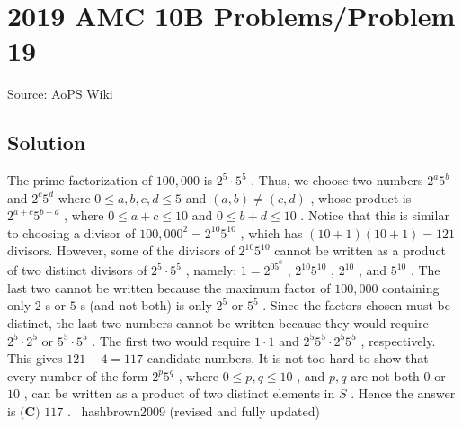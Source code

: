\documentclass[12pt]{article}
\begin{document}
\section*{{2019 AMC 10B Problems/Problem 19}}
Source: AoPS Wiki

\subsection*{Solution}
The prime factorization of $100,000$ is $2^5 \cdot 5^5$ . Thus, we choose two numbers $2^a5^b$ and $2^c5^d$ where $0 \le a,b,c,d \le 5$ and $(a,b) \neq (c,d)$ , whose product is $2^{a+c}5^{b+d}$ , where $0 \le a+c \le 10$ and $0 \le b+d \le 10$ . Notice that this is similar to choosing a divisor of $100,000^2 = 2^{10}5^{10}$ , which has $(10+1)(10+1) = 121$ divisors. However, some of the divisors of $2^{10}5^{10}$ cannot be written as a product of two distinct divisors of $2^5 \cdot 5^5$ , namely: $1 = 2^05^0$ , $2^{10}5^{10}$ , $2^{10}$ , and $5^{10}$ . The last two cannot be written because the maximum factor of $100,000$ containing only $2$ s or $5$ s (and not both) is only $2^5$ or $5^5$ . Since the factors chosen must be distinct, the last two numbers cannot be written because they would require $2^5 \cdot 2^5$ or $5^5 \cdot 5^5$ . The first two would require $1 \cdot 1$ and $2^{5}5^{5} \cdot 2^{5}5^{5}$ , respectively. This gives $121-4 = 117$ candidate numbers. It is not too hard to show that every number of the form $2^p5^q$ , where $0 \le p, q \le 10$ , and $p,q$ are not both $0$ or $10$ , can be written as a product of two distinct elements in $S$ . Hence the answer is $\boxed{\textbf{(C) } 117}$ . ~hashbrown2009 (revised and fully updated)
\end{document}
